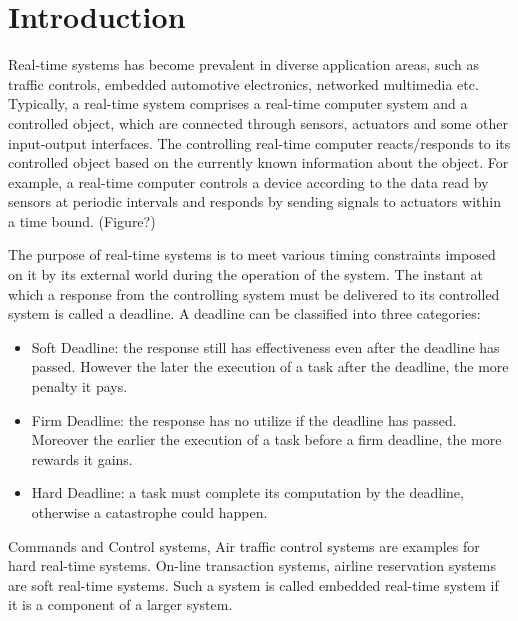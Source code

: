 \documentclass[preprint,12pt]{elsarticle}
\begin{document}
\linenumbers

\section{Introduction} \label{S:1}

Real-time systems has become prevalent in diverse application areas, such as traffic controls, embedded automotive electronics, networked multimedia etc. Typically, a real-time system comprises a real-time computer system and a controlled object, which are connected through sensors, actuators and some other input-output interfaces. The controlling real-time computer reacts/responds to its controlled object based on the currently known information about the object. For example, a real-time computer controls a device according to the data read by sensors at periodic intervals and responds by sending signals to actuators within a time bound. (Figure?)

The purpose of real-time systems is to meet various timing constraints imposed on it by its external world during the operation of the system.
The instant at which a response from the controlling system must be delivered to its controlled system is called a deadline. A deadline can be classified into three categories\cite{mohammadi2005scheduling}:

\begin{itemize}
\item Soft Deadline: the response still has effectiveness even after the deadline has passed. However the later the execution of a task after the deadline, the more penalty it pays.
\item Firm Deadline: the response has no utilize if the deadline has passed. Moreover the earlier the execution of a task before a firm deadline, the more rewards it gains.

\item Hard Deadline: a task must complete its computation by the deadline, otherwise a catastrophe could happen.

\end{itemize}

Commands and Control systems, Air traffic control systems are examples for hard real-time systems. On-line transaction systems, airline reservation systems are soft real-time systems\cite{davis2011survey}. Such a system is called embedded real-time system if it is a component of a larger system.
\end{document}
